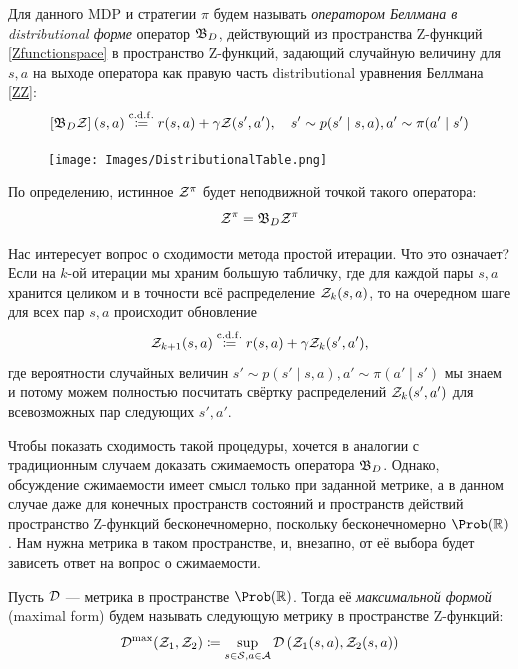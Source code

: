 \begin{definition}
Для данного MDP и стратегии $\pi$ будем называть \emph{оператором Беллмана в distributional форме} оператор $\mathfrak{B}_D$, действующий из пространства Z-функций \eqref{Zfunctionspace} в пространство Z-функций, задающий случайную величину для $s, a$ на выходе оператора как правую часть distributional уравнения Беллмана \eqref{ZZ}:
$$\left[\mathfrak{B}_D \mathcal{Z}\right](s, a) \mathrel{\stackrel{\mathrm{c.d.f.}}\coloneqq} r(s, a) + \gamma \mathcal{Z}(s', a'), \quad s' \sim p(s' \mid s, a), a' \sim \pi(a' \mid s')$$
\end{definition}

\begin{figure}
\vspace{-0.5cm}
\centering
\texttt{[image: Images/DistributionalTable.png]}
\vspace{-0.4cm}
\end{figure}

По определению, истинное $\mathcal{Z}^\pi$ будет неподвижной точкой такого оператора:
$$\mathcal{Z}^\pi = \mathfrak{B}_D \mathcal{Z}^\pi$$

Нас интересует вопрос о сходимости метода простой итерации. Что это означает? Если на $k$-ой итерации мы храним большую табличку, где для каждой пары $s, a$ хранится целиком и в точности всё распределение $\mathcal{Z}_k(s, a)$, то на очередном шаге для всех пар $s, a$ происходит обновление
\begin{equation}\label{distrpolicyevalupdate}
    \mathcal{Z}_{k+1}(s, a) \mathrel{\stackrel{\mathrm{c.d.f.}}\coloneqq} r(s, a) + \gamma \mathcal{Z}_k(s', a'),
\end{equation}
где вероятности случайных величин $s' \sim p(s' \mid s, a), a' \sim \pi(a' \mid s')$ мы знаем и потому можем полностью посчитать свёртку распределений $\mathcal{Z}_k(s', a')$ для всевозможных пар следующих $s', a'$. 

Чтобы показать сходимость такой процедуры, хочется в аналогии с традиционным случаем доказать сжимаемость оператора $\mathfrak{B}_D$. Однако, обсуждение сжимаемости имеет смысл только при заданной метрике, а в данном случае даже для конечных пространств состояний и пространств действий пространство Z-функций бесконечномерно, поскольку бесконечномерно $\Prob (\R)$. Нам нужна метрика в таком пространстве, и, внезапно, от её выбора будет зависеть ответ на вопрос о сжимаемости.

\begin{definition}
Пусть $\mathcal{D}$ --- метрика в пространстве $\Prob (\R)$. Тогда её \emph{максимальной формой} (maximal form) будем называть следующую метрику в пространстве Z-функций:
$$\mathcal{D}^{\max}(\mathcal{Z}_1, \mathcal{Z}_2) \coloneqq \sup\limits_{s \in \mathcal{S}, a \in \mathcal{A}} \mathcal{D} \left( \mathcal{Z}_1(s, a), \mathcal{Z}_2(s, a) \right)$$
\end{definition}

